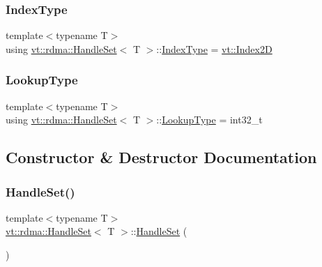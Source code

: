 \mbox{\label{structvt_1_1rdma_1_1_handle_set_aa0dbb6a47c459fb4290f0ca96e573097}} 
\subsubsection{\texorpdfstring{Index\+Type}{IndexType}}
{\footnotesize\ttfamily template$<$typename T$>$ \\
using \hyperlink{structvt_1_1rdma_1_1_handle_set}{vt\+::rdma\+::\+Handle\+Set}$<$ T $>$\+::\hyperlink{structvt_1_1rdma_1_1_handle_set_aa0dbb6a47c459fb4290f0ca96e573097}{Index\+Type} =  \hyperlink{namespacevt_a3bab786053b74a3d856fff1412ffa73a}{vt\+::\+Index2D}}

\mbox{\label{structvt_1_1rdma_1_1_handle_set_a81d333ec397f0becb9fe692e53145441}} 
\subsubsection{\texorpdfstring{Lookup\+Type}{LookupType}}
{\footnotesize\ttfamily template$<$typename T$>$ \\
using \hyperlink{structvt_1_1rdma_1_1_handle_set}{vt\+::rdma\+::\+Handle\+Set}$<$ T $>$\+::\hyperlink{structvt_1_1rdma_1_1_handle_set_a81d333ec397f0becb9fe692e53145441}{Lookup\+Type} =  int32\+\_\+t}



\subsection{Constructor \& Destructor Documentation}
\mbox{\label{structvt_1_1rdma_1_1_handle_set_a61565fe70c627c3fb0f68b3585610587}} 
\subsubsection{\texorpdfstring{Handle\+Set()}{HandleSet()}\hspace{0.1cm}{\footnotesize\ttfamily [1/4]}}
{\footnotesize\ttfamily template$<$typename T$>$ \\
\hyperlink{structvt_1_1rdma_1_1_handle_set}{vt\+::rdma\+::\+Handle\+Set}$<$ T $>$\+::\hyperlink{structvt_1_1rdma_1_1_handle_set}{Handle\+Set} (\begin{DoxyParamCaption}{ }\end{DoxyParamCaption})\hspace{0.3cm}{\ttfamily [default]}}

